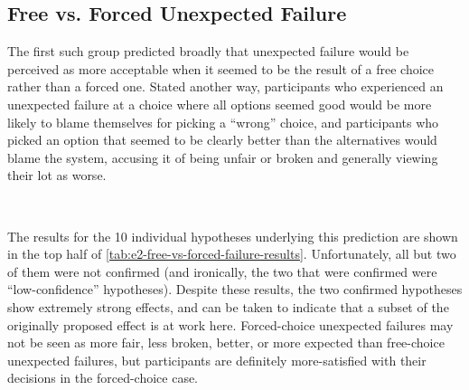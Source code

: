 \subsection{Free vs\@. Forced Unexpected Failure}

The first such group predicted broadly that unexpected failure would be perceived as more acceptable when it seemed to be the result of a free choice rather than a forced one.
%
Stated another way, participants who experienced an unexpected failure at a choice where all options seemed good would be more likely to blame themselves for picking a ``wrong'' choice, and participants who picked an option that seemed to be clearly better than the alternatives would blame the system, accusing it of being unfair or broken and generally viewing their lot as worse.

\begin{table}[!p]
\centering
\bgroup
\def\arraystretch{1.3}
\setlength{\tabcolsep}{0.6em}
 \\[3ex]

\egroup
\caption[Retrospective free vs\@. forced failure results]{%
Retrospective hypotheses for the claim that ``Unexpected failure is more acceptable when it happens at a freely-chosen option than when the player feels there are no viable alternative options.''
%
The bottom half shows the results when choice 8638 is allowed to stand in for the entire \obvfm{} case.
%
Each line lists the hypothesis, the $p$-value, and if significant ($p < 0.05$), the common-language effect size.
%
Low-confidence hypotheses are marked with a `\lc/'.
%
Note that each pair of rows contains opposing predictions, because complementary questions are arranged together.}
  \label{tab:e2-free-vs-forced-failure-results}
\end{table}


The results for the 10 individual hypotheses underlying this prediction are shown in the top half of \cref{tab:e2-free-vs-forced-failure-results}.
%
Unfortunately, all but two of them were not confirmed (and ironically, the two that were confirmed were ``low-confidence'' hypotheses).
%
Despite these results, the two confirmed hypotheses show extremely strong effects, and can be taken to indicate that a subset of the originally proposed effect is at work here.
%
Forced-choice unexpected failures may not be seen as more fair, less broken, better, or more expected than free-choice unexpected failures, but participants are definitely more-satisfied with their decisions in the forced-choice case.


